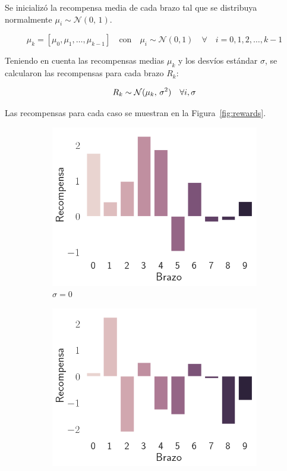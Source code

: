 \documentclass[12pt]{article}
\begin{document}
    Se inicializó la recompensa media de cada brazo tal que se distribuya normalmente $\mu_{i} \sim \mathcal{N}(0,\,1)$.

    \[
        \mu_k = \left[ \mu_{0}, \mu_{1}, \ldots, \mu_{k-1} \right] \quad \text{con} \quad \mu_{i} \sim \mathcal{N}(0, 1) \quad \forall \quad i = 0, 1, 2, \ldots, k-1
    \]

    Teniendo en cuenta las recompensas medias $\mu_{k}$ y los desvíos estándar $\sigma$, se calcularon las recompensas para cada brazo $R_{k}$:

    \[
        R_k \sim \mathcal{N}(\mu_k,\,\sigma^{2}) \quad \forall i,\sigma \\
    \]

    Las recompensas para cada caso se muestran en la Figura~\ref{fig:rewards}.

    \begin{figure}[H]
        \centering
        \begin{subfigure}[H]{0.3\textwidth}
            \includegraphics[width=\textwidth]{../img/rewards_sigma_0}
            \caption{$\sigma=0$}
            \label{fig:rewards_0}
        \end{subfigure}
        \begin{subfigure}[H]{0.3\textwidth}
            \includegraphics[width=\textwidth]{../img/rewards_sigma_1}

\end{subfigure}
\end{figure}
\end{document}
